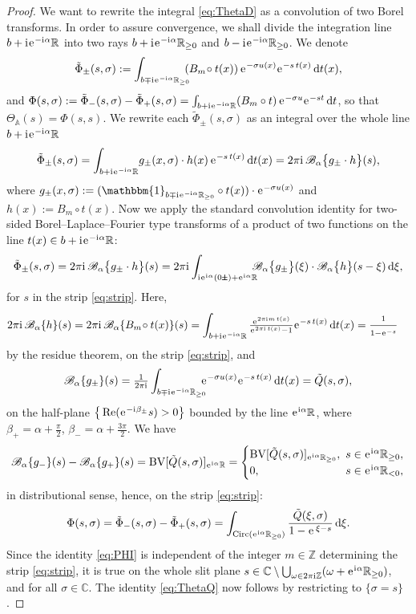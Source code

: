\documentclass[10pt,a4paper]{amsart}
\newcommand{\BV}{\operatorname{BV}}
\newcommand{\Borel}{\mathscr{B}}
\newcommand{\Circ}{\operatorname{Circ}}
\newcommand{\C}{{\mathbb C}}
\newcommand{\R}{{\mathbb R}}
\newcommand{\Z}{{\mathbb Z}}
\newcommand{\e}{\ensuremath{\mkern.25\thinmuskip\mathrm{e}\mkern.4\thinmuskip}}
\newcommand{\mfrac}[2]{\tfrac{#1\strut}{#2\strut}}
\newcommand{\orbit}{\mathbb{A}}
\newcommand{\pms}{{\scalebox{0.7}{$\pmb{\pm}$}}}
\newcommand{\sminus}{\setminus} %
\renewcommand{\Re}{\operatorname{Re}}
\renewcommand{\d}{\ensuremath{\operatorname{d}\!}}
\renewcommand{\i}{\mathrm{i}\mkern.25\thinmuskip}
\begin{document}
\begin{proof}
We want to rewrite the integral \eqref{eq:ThetaD} as a convolution of two Borel transforms. In order to assure convergence, we shall divide the integration line $b+\i\e^{-\i\alpha}\R$ into two rays 
$b+\i\e^{-\i\alpha}\R_{\geq 0}$ and $b-\i \e^{-\i\alpha}\R_{\geq 0}$. 
We denote
\[\tilde\Phi_\pm(s,\sigma):=\int_{b\mp\i \e^{-\i\alpha}\R_{\geq 0}}\!\!\!(B_m\!\circ t(x))\,\e^{-\sigma u(x)}\e^{-s\,t(x)}\d t(x),\]
and $\Phi(s,\sigma):=\tilde\Phi_-(s,\sigma)-\tilde\Phi_+(s,\sigma)=\int_{b+\i\e^{-\i\alpha}\R}(B_m\circ t)\,\e^{-\sigma u}\e^{-st}\d t$, so that $\Theta_\orbit(s)=\Phi(s,s)$.
We rewrite each $\tilde\Phi_\pm(s,\sigma)$ as an integral over the whole line $b+\i\e^{-\i\alpha}\R$
\[\tilde\Phi_\pm(s,\sigma)=\int_{b+\i\e^{-\i\alpha}\R}\!
g_\pm(x,\sigma)\cdot h(x)\,\e^{-s\,t(x)}\d t(x)=
2\pi\i\,\Borel_\alpha\big\{g_\pm\cdot h\big\}(s),
\]
where
$g_\pm(x,\sigma):= (\mathbbm{1}_{b\mp\i\e^{-\i\alpha}\R_{\geq 0} } \circ t(x))\cdot\e^{-\sigma u(x)}$ and $h(x):=B_m\!\circ t(x)$.
Now we apply the standard convolution identity
for two-sided Borel--Laplace--Fourier type transforms of a product of two functions on the line $t(x)\in b+\i\e^{-\i\alpha}\R$: 
\[\tilde \Phi_\pm(s,\sigma)=2\pi\i\,\Borel_\alpha\big\{g_\pm \cdot h\big\}(s)
=2\pi\i\int_{\i\e^{\i\alpha}(0\pms)+\e^{\i\alpha}\R}\!\!\!\!
\Borel_\alpha\big\{g_\pm\big\}(\xi)\cdot\Borel_\alpha\big\{h\big\}(s-\xi)\d\xi,\]
for $s$ in the strip \eqref{eq:strip}.
Here,
\begin{align*}
2\pi\i\,\Borel_\alpha\{h\}(s)&=2\pi\i\,\Borel_\alpha\{B_m\!\circ t(x)\}(s)=
\int_{b+\i\e^{-\i\alpha}\R} \tfrac{\e^{2\pi\i m\,t(x)}}{\e^{2\pi\i\, t(x)}-1}\e^{-s\,t(x)}\d t(x) =\mfrac{1}{1-\e^{-s}}
\end{align*}
by the residue theorem, on the strip \eqref{eq:strip}, and
\[\Borel_\alpha\{g_\pm\}(s)= \tfrac{1}{2\pi\i}\int_{b\mp\i\e^{-\i\alpha}\R_{\geq 0}}\!\!\!\! \e^{-\sigma u(x)}\e^{-s\,t(x)}\d t(x) = \tilde Q(s,\sigma), \]
on the half-plane 
$\big\{\Re(\e^{-\i\beta_\pm}s)>0\big\}$ bounded by the line $\e^{\i\alpha}\R$,
where $\beta_+=\alpha+\frac\pi2$, $\beta_-=\alpha+\frac{3\pi}{2}$. 
We have
\[\Borel_\alpha\{g_-\}(s)-\Borel_\alpha\{g_+\}(s)=\BV[\tilde Q(s,\sigma)]_{\e^{\i\alpha}\R}=
\begin{cases}
\BV[\tilde Q(s,\sigma)]_{\e^{\i\alpha}\R_{\geq0}},\!\!\! & s\in\e^{\i\alpha}\R_{\geq 0},\\0,&s\in\e^{\i\alpha}\R_{<0},
\end{cases}
\]
in distributional sense, hence, on the strip \eqref{eq:strip}:
\begin{equation}\label{eq:PHI}
\Phi(s,\sigma)=\tilde\Phi_-(s,\sigma)-\tilde\Phi_+(s,\sigma)=\int_{\Circ(\e^{\i\alpha}\R_{\geq 0})} \frac{\tilde Q(\xi,\sigma)}{1-\e^{\,\xi-s}}\d\xi.
\end{equation}
Since  the identity \eqref{eq:PHI} is independent of the integer $m\in\Z$ determining the strip \eqref{eq:strip}, it is true on the whole slit plane $s\in\C\sminus\bigcup_{\omega\in 2\pi\i \Z}(\omega+\e^{\i\alpha}\R_{\geq 0})$, and for all $\sigma\in\C$.
The identity \eqref{eq:ThetaQ} now follows by restricting to $\{\sigma=s\}$. 
\end{proof}
\end{document}
